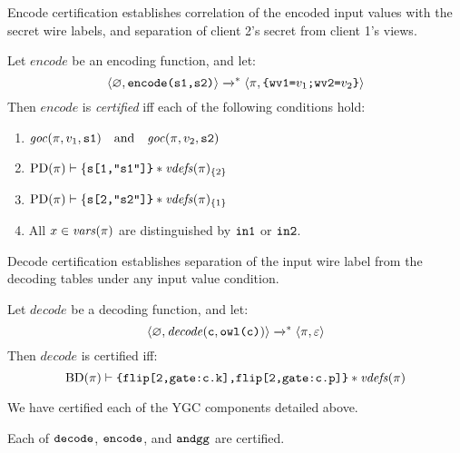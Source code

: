 Encode certification establishes correlation of the encoded input values with
the secret wire labels, and separation of client 2's secret from client 1's views. 
\begin{definition}
  \label{definition-ygcencode-certification}
  Let $\mathit{encode}$ be an encoding function, and let:
  $$
  \langle \varnothing,\texttt{encode(s1,s2)} \rangle \xrightarrow{}^{*}
  \langle \pi,\texttt{\{wv1=}v_1\texttt{;wv2=}v_2\texttt{\}} \rangle
  $$
  Then $\mathit{encode}$ is \emph{certified} iff each of the following conditions hold:
  \begin{enumerate}[\hspace{5mm}i.]
  \item $\mathit{goc}(\pi,v_1,\texttt{s1}) \quad \text{and} \quad \mathit{goc}(\pi,v_2,\texttt{s2})$
  \item $\mathrm{PD}(\pi) \vdash \{\texttt{s[1,"s1"]\}} * \mathit{vdefs}(\pi)_{\{2\}}$
  \item $\mathrm{PD}(\pi) \vdash \{\texttt{s[2,"s2"]\}} * \mathit{vdefs}(\pi)_{\{1\}}$    
  \item All $x \in \mathit{vars}(\pi)$ are distinguished by $\texttt{in1}$ or $\texttt{in2}$. 
  \end{enumerate}
\end{definition}
Decode certification establishes separation of the input wire
label from the decoding tables under any input value condition. 
\begin{definition}
  \label{definition-ygdecode-certification}
  Let $\mathit{decode}$ be a decoding function, and let:
  $$
  \langle \varnothing,\mathit{decode}(\texttt{c}, \texttt{owl(c)}) \rangle
  \xrightarrow{}^{*} \langle \pi,\varepsilon \rangle
  $$
  Then $\mathit{decode}$ is certified iff:
  $$
  \mathrm{BD}(\pi) \vdash \texttt{\{flip[2,gate:c.k],flip[2,gate:c.p]\}} * \mathit{vdefs}(\pi)
  $$
\end{definition}
We have certified each of the YGC components detailed above. 
\begin{lemma}
  \label{lemma-ygc-certification}
  Each of $\texttt{decode}$, $\texttt{encode}$, and $\texttt{andgg}$ are certified.
\end{lemma}

